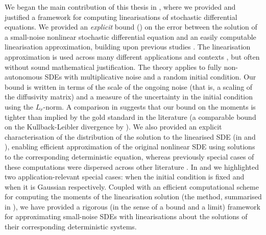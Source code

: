 We began the main contribution of this thesis in , where we provided and justified a framework for computing linearisations of stochastic differential equations.
We provided an \emph{explicit} bound () on the error between the solution of a small-noise nonlinear stochastic differential equation and an easily computable linearisation approximation, building upon previous studies \citep{Blagoveshchenskii_1962_DiffusionProcessesDepending,FreidlinWentzell_1998_RandomPerturbationsDynamical,Sanz-AlonsoStuart_2017_GaussianApproximationsSmall}.
The linearisation approximation is used across many different applications and contexts \citep[e.g.]{Jazwinski_2014_StochasticProcessesFiltering, Sanz-AlonsoStuart_2017_GaussianApproximationsSmall,KaszasHaller_2020_UniversalUpperEstimate,ArchambeauEtAl_2007_GaussianProcessApproximations}, but often without sound mathematical justification.
The theory applies to fully non-autonomous SDEs with multiplicative noise and a random initial condition.
Our bound is written in terms of the scale of the ongoing noise (that is, a scaling of the diffusivity matrix) and a measure of the uncertainty in the initial condition using the \(L_r\)-norm.
A comparison in  suggests that our bound on the moments is tighter than implied by the gold standard in the literature (a comparable bound on the Kullback-Leibler divergence by \citet{Sanz-AlonsoStuart_2017_GaussianApproximationsSmall}).
We also provided an explicit characterisation of the distribution of the solution to the linearised SDE (in  and ), enabling efficient approximation of the original nonlinear SDE using solutions to the corresponding deterministic equation, whereas previously special cases of these computations were dispersed across other literature \citep[e.g.]{Jazwinski_2014_StochasticProcessesFiltering,Sanz-AlonsoStuart_2017_GaussianApproximationsSmall,SarkkaSolin_2019_AppliedStochasticDifferential}.
In  and  we highlighted two application-relevant special cases: when the initial condition is fixed and when it is Gaussian respectively.
Coupled with an efficient computational scheme for computing the moments of the linearisation solution (the \citet{Mazzoni_2008_ComputationalAspectsContinuous} method, summarised in ), we have provided a rigorous (in the sense of a bound and a limit) framework for approximating small-noise SDEs with linearisations about the solutions of their corresponding deterministic systems.

